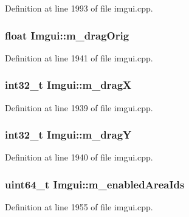 Definition at line 1993 of file imgui.\+cpp.

\hypertarget{struct_imgui_ad4f0591e5e4bdb67821f66c66b7d9902}{
\subsubsection[{m\+\_\+drag\+Orig}]{\setlength{\rightskip}{0pt plus 5cm}float Imgui\+::m\+\_\+drag\+Orig}}\label{struct_imgui_ad4f0591e5e4bdb67821f66c66b7d9902}


Definition at line 1941 of file imgui.\+cpp.

\hypertarget{struct_imgui_aefd00be44d7c6a969eff513f2ffb4552}{
\subsubsection[{m\+\_\+drag\+X}]{\setlength{\rightskip}{0pt plus 5cm}int32\+\_\+t Imgui\+::m\+\_\+drag\+X}}\label{struct_imgui_aefd00be44d7c6a969eff513f2ffb4552}


Definition at line 1939 of file imgui.\+cpp.

\hypertarget{struct_imgui_a871d49118493dfed45309a8104a396f8}{
\subsubsection[{m\+\_\+drag\+Y}]{\setlength{\rightskip}{0pt plus 5cm}int32\+\_\+t Imgui\+::m\+\_\+drag\+Y}}\label{struct_imgui_a871d49118493dfed45309a8104a396f8}


Definition at line 1940 of file imgui.\+cpp.

\hypertarget{struct_imgui_acbbe53140f85331b41d31dccd4b75c9e}{
\subsubsection[{m\+\_\+enabled\+Area\+Ids}]{\setlength{\rightskip}{0pt plus 5cm}uint64\+\_\+t Imgui\+::m\+\_\+enabled\+Area\+Ids}}\label{struct_imgui_acbbe53140f85331b41d31dccd4b75c9e}


Definition at line 1955 of file imgui.\+cpp.

